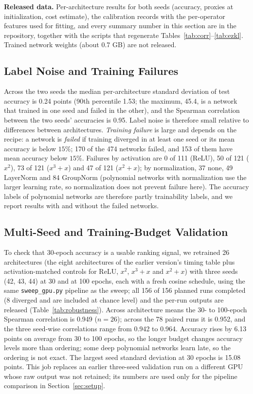 \textbf{Released data.}  Per-architecture results for both seeds (accuracy, proxies at initialization, cost estimate), the calibration records with the per-operator
features used for fitting, and every summary number in this section are in the repository, together with the scripts that regenerate Tables~\ref{tab:corr}--\ref{tab:ezkl}.
Trained network weights (about 0.7 GB) are not released.

\subsection{Label Noise and Training Failures}

Across the two seeds the median per-architecture standard deviation of test accuracy is 0.24 points (90th percentile 1.53; the maximum, 45.4,
is a network that trained in one seed and failed in the other), and the Spearman correlation between the two seeds' accuracies is 0.95.
Label noise is therefore small relative to differences between architectures.  \emph{Training failure} is large and depends on the recipe:
a network is \emph{failed} if training diverged in at least one seed or its mean accuracy is below $15\%$; 170 of the 474 networks failed, and 153 of them have mean accuracy below $15\%$.
Failures by activation are 0 of 111 (ReLU), 50 of 121 ($x^2$),
73 of 121 ($x^3{+}x$) and 47 of 121 ($x^2{+}x$); by normalization, 37 none, 49 LayerNorm and 84 GroupNorm
(polynomial networks with normalization use the larger learning rate, so normalization does not prevent failure here).  The accuracy labels of polynomial networks are therefore
partly trainability labels, and we report results with and without the failed networks.

\subsection{Multi-Seed and Training-Budget Validation}
\label{sec:robust}

To check that 30-epoch accuracy is a usable ranking signal, we retrained 26 architectures (the eight architectures of the earlier version's timing table plus activation-matched controls for ReLU, $x^2$, $x^3{+}x$ and $x^2{+}x$)
with three seeds (42, 43, 44) at 30 and at 100 epochs, each with a fresh cosine schedule, using the same \texttt{sweep\_gpu.py} pipeline as the sweep; all 156 of 156 planned runs completed
(8 diverged and are included at chance level) and the per-run outputs are released (Table~\ref{tab:robustness}).  Across architecture means the 30- to 100-epoch Spearman correlation is 0.949 ($n=26$);
across the 78 paired runs it is 0.952, and the three seed-wise correlations range from 0.942 to 0.964.  Accuracy rises by 6.13 points on average from 30 to 100 epochs,
so the longer budget changes accuracy levels more than ordering; some deep polynomial networks learn late, so the ordering is not exact.  The largest seed standard deviation at 30 epochs is 15.08 points.
This job replaces an earlier three-seed validation run on a different GPU whose raw output was not retained; its numbers are used only for the pipeline comparison in Section~\ref{sec:setup}.

